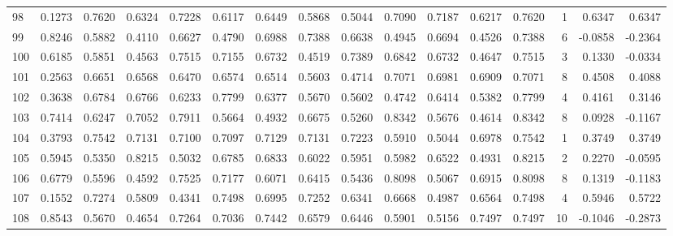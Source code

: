 \begin{tabular}{lrrrrrrrrrrrrrrr}
98  &      0.1273 &  0.7620 &  0.6324 &  0.7228 &  0.6117 &  0.6449 &  0.5868 &  0.5044 &  0.7090 &  0.7187 &   0.6217 &     0.7620 &      1 &                    0.6347 &                     0.6347 \\
99  &      0.8246 &  0.5882 &  0.4110 &  0.6627 &  0.4790 &  0.6988 &  0.7388 &  0.6638 &  0.4945 &  0.6694 &   0.4526 &     0.7388 &      6 &                   -0.0858 &                    -0.2364 \\
100 &      0.6185 &  0.5851 &  0.4563 &  0.7515 &  0.7155 &  0.6732 &  0.4519 &  0.7389 &  0.6842 &  0.6732 &   0.4647 &     0.7515 &      3 &                    0.1330 &                    -0.0334 \\
101 &      0.2563 &  0.6651 &  0.6568 &  0.6470 &  0.6574 &  0.6514 &  0.5603 &  0.4714 &  0.7071 &  0.6981 &   0.6909 &     0.7071 &      8 &                    0.4508 &                     0.4088 \\
102 &      0.3638 &  0.6784 &  0.6766 &  0.6233 &  0.7799 &  0.6377 &  0.5670 &  0.5602 &  0.4742 &  0.6414 &   0.5382 &     0.7799 &      4 &                    0.4161 &                     0.3146 \\
103 &      0.7414 &  0.6247 &  0.7052 &  0.7911 &  0.5664 &  0.4932 &  0.6675 &  0.5260 &  0.8342 &  0.5676 &   0.4614 &     0.8342 &      8 &                    0.0928 &                    -0.1167 \\
104 &      0.3793 &  0.7542 &  0.7131 &  0.7100 &  0.7097 &  0.7129 &  0.7131 &  0.7223 &  0.5910 &  0.5044 &   0.6978 &     0.7542 &      1 &                    0.3749 &                     0.3749 \\
105 &      0.5945 &  0.5350 &  0.8215 &  0.5032 &  0.6785 &  0.6833 &  0.6022 &  0.5951 &  0.5982 &  0.6522 &   0.4931 &     0.8215 &      2 &                    0.2270 &                    -0.0595 \\
106 &      0.6779 &  0.5596 &  0.4592 &  0.7525 &  0.7177 &  0.6071 &  0.6415 &  0.5436 &  0.8098 &  0.5067 &   0.6915 &     0.8098 &      8 &                    0.1319 &                    -0.1183 \\
107 &      0.1552 &  0.7274 &  0.5809 &  0.4341 &  0.7498 &  0.6995 &  0.7252 &  0.6341 &  0.6668 &  0.4987 &   0.6564 &     0.7498 &      4 &                    0.5946 &                     0.5722 \\
108 &      0.8543 &  0.5670 &  0.4654 &  0.7264 &  0.7036 &  0.7442 &  0.6579 &  0.6446 &  0.5901 &  0.5156 &   0.7497 &     0.7497 &     10 &                   -0.1046 &                    -0.2873 \\

\end{tabular}

